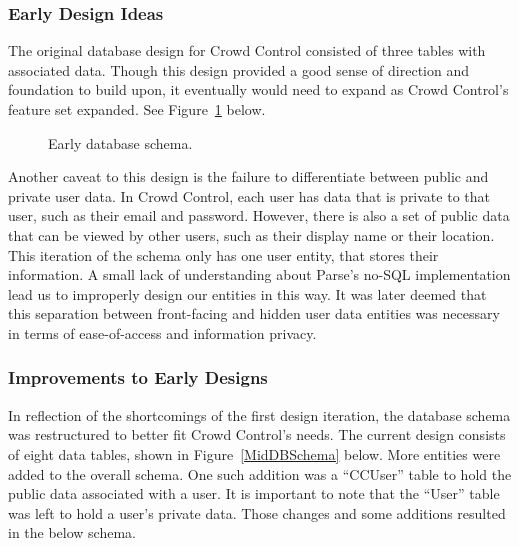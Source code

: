 \subsubsection{Early Design Ideas}
The original database design for Crowd Control consisted of three tables with associated data. Though this design provided a good sense of direction and foundation to build upon, it eventually would need to expand as Crowd Control's feature set expanded. See Figure~\ref{EarlyDBSchema} below.

	\begin{figure}[tbh]
	\begin{center}
	\end{center}
	\caption{Early database schema. \label{EarlyDBSchema}}
	\end{figure}

Another caveat to this design is the failure to differentiate between public and private user data. In Crowd Control, each user has data that is private to that user, such as their email and password. However, there is also a set of public data that can be viewed by other users, such as their display name or their location. This iteration of the schema only has one user entity, that stores their information. A small lack of understanding about Parse's no-SQL implementation lead us to improperly design our entities in this way. It was later deemed that this separation between front-facing and hidden user data entities was necessary in terms of ease-of-access and information privacy.

\subsubsection{Improvements to Early Designs}
In reflection of the shortcomings of the first design iteration, the database schema was restructured to better fit Crowd Control's needs. The current design consists of eight data tables,  shown in Figure~\ref{MidDBSchema} below. More entities were added to the overall schema. One such addition was a ``CCUser'' table to hold the public data associated with a user. It is important to note that the ``User'' table was left to hold a user's private data. Those changes and some additions resulted in the below schema. 

